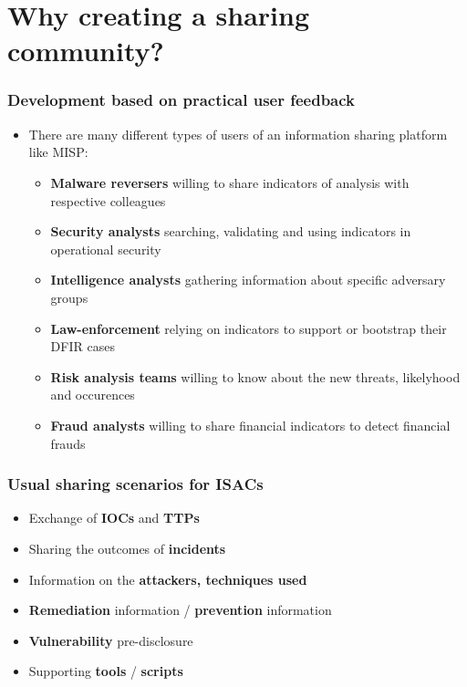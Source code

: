 \section{Why creating a sharing\\ community?}

\begin{frame}
    \frametitle{Development based on practical user feedback}
    \begin{itemize}
        \item There are many different types of users of an information sharing platform like MISP:
        \begin{itemize}
            \item \textbf{Malware reversers} willing to share indicators of analysis with respective colleagues
            \item \textbf{Security analysts} searching, validating and using indicators in operational security
            \item \textbf{Intelligence analysts} gathering information about specific adversary groups
            \item \textbf{Law-enforcement} relying on indicators to support or bootstrap their DFIR cases
            \item \textbf{Risk analysis teams} willing to know about the new threats, likelyhood and occurences
            \item \textbf{Fraud analysts} willing to share financial indicators to detect financial frauds
        \end{itemize}
    \end{itemize}
\end{frame}

\begin{frame}
	\frametitle{Usual sharing scenarios for ISACs}
	\begin{itemize}
		\item Exchange of \textbf{IOCs} and \textbf{TTPs}
		\item Sharing the outcomes of \textbf{incidents}
		\item Information on the \textbf{attackers, techniques used}
		\item \textbf{Remediation} information / \textbf{prevention} information
		\item \textbf{Vulnerability} pre-disclosure
		\item Supporting \textbf{tools} / \textbf{scripts}
	\end{itemize}
\end{frame}

